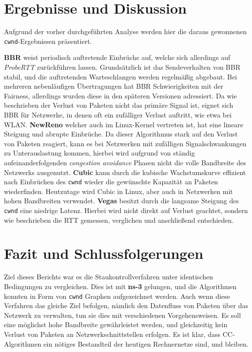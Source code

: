 \documentclass[paper=a4,fontsize=12pt,ngerman]{scrartcl}
\begin{document}
\section{Ergebnisse und Diskussion}
Aufgrund der vorher durchgeführten Analyse werden hier die daraus gewonnenen \texttt{cwnd}-Ergebnissen präsentiert. 

\textbf{BBR} weist periodisch auftretende Einbrüche auf, welche sich allerdings auf \textit{ProbeRTT} zurückführen lassen.
Grundsätzlich ist das Sendeverhalten von BBR stabil, und die auftretenden Warteschlangen werden regelmäßig abgebaut.
Bei mehreren nebenläufigen Übertragungen hat BBR Schwierigkeiten mit der Fairness, allerdings wurden diese in den späteren
Versionen adressiert. Da wie beschrieben der Verlust von Paketen nicht das primäre Signal ist, eignet sich BBR für 
Netzwerke, in denen oft ein zufälliger Verlust auftritt, wie etwa bei WLAN. \newline \newline
\textbf{NewReno} welcher auch im Linux-Kernel vertreten ist, hat eine lineare Steigung und abrupte Einbrüche.
Da dieser Algorithmus stark auf den Verlust von Paketen reagiert, kann es bei Netzwerken mit zufälligen Signalschwankungen
zu Unterauslastung kommen, hierbei wird aufgrund von ständig aufeinanderfolgenden \textit{congestion avoidance} Phasen
nicht die volle Bandbreite des Netzwerks ausgenutzt. \newline \newline
\textbf{Cubic} kann durch die kubische Wachstumskurve effizient nach Einbrüchen des \texttt{cwnd} wieder die gewünschte 
Kapazität an Paketen wiederfinden. Heutzutage wird Cubic in Linux, aber auch in Netzwerken mit hohen Bandbreiten verwendet.\cite{pandorafms} \newline \newline
\textbf{Vegas} besitzt durch die langsame Steigung des \texttt{cwnd} eine niedrige Latenz.
Hierbei wird nicht direkt auf Verlust geachtet, sondern wie beschrieben die RTT gemessen, verglichen und anschließend entschieden.



\section{Fazit und Schlussfolgerungen}
Ziel dieses Berichts war es die Staukontrollverfahren unter identischen Bedingungen zu vergleichen.
Dies ist mit \textbf{ns-3} gelungen, und die Algorithmen konnten in Form von \texttt{cwnd} Graphen aufgezeichnet
werden.
Auch wenn diese Verfahren das gleiche Ziel befolgen, nämlich den Datenfluss von Paketen über das Netzwerk zu 
verwalten, tun sie dies mit verschiedenen Vorgehensweisen. Es soll eine möglichst hohe Bandbreite gewährleistet
werden, und gleichzeitig kein Verlust von Paketen an Netzwerkschnittstellen erfolgen. Es ist klar, dass CC-Algorithmen
ein nötiges Bestandteil der heutigen Rechnernetze sind, und bleiben.
\end{document}
